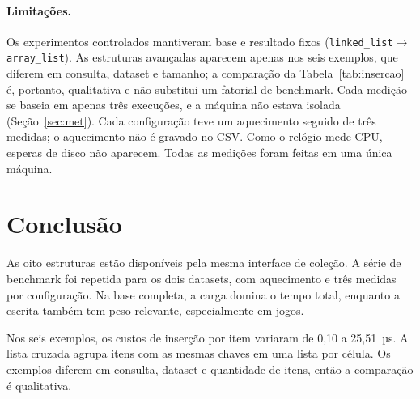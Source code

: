 \documentclass[11pt,a4paper]{article}
\begin{document}
\paragraph{Limitações.} Os experimentos controlados mantiveram base e resultado fixos (\texttt{linked\_\allowbreak{}list}$\rightarrow$\allowbreak{}\texttt{array\_\allowbreak{}list}). As estruturas avançadas aparecem apenas nos seis exemplos, que diferem em consulta, dataset e tamanho; a comparação da Tabela~\ref{tab:insercao} é, portanto, qualitativa e não substitui um fatorial de benchmark. Cada medição se baseia em apenas três execuções, e a máquina não estava isolada (Seção~\ref{sec:met}). Cada configuração teve um aquecimento seguido de três medidas; o aquecimento não é gravado no CSV. Como o relógio mede CPU, esperas de disco não aparecem. Todas as medições foram feitas em uma única máquina.

\section{Conclusão}

As oito estruturas estão disponíveis pela mesma interface de coleção. A série de benchmark foi repetida para os dois datasets, com aquecimento e três medidas por configuração. Na base completa, a carga domina o tempo total, enquanto a escrita também tem peso relevante, especialmente em jogos.

Nos seis exemplos, os custos de inserção por item variaram de 0,10 a 25,51~µs. A lista cruzada agrupa itens com as mesmas chaves em uma lista por célula. Os exemplos diferem em consulta, dataset e quantidade de itens, então a comparação é qualitativa.
\end{document}
